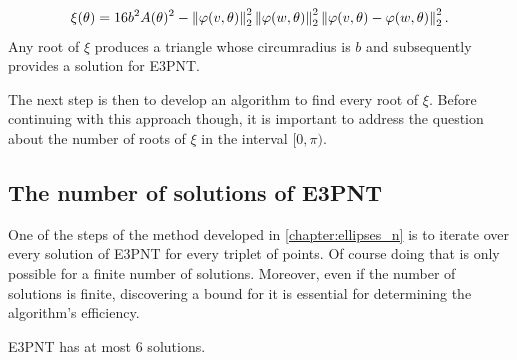 \begin{equation}\label{eq:circumscribed_circle_b}
\xi(\theta) = 16b^2A(\theta)^2 - \left\lVert\varphi(v, \theta)\right\rVert_{2}^2\left\lVert\varphi(w, \theta)\right\rVert_{2}^2\left\lVert\varphi(v, \theta)-\varphi(w, \theta)\right\rVert_{2}^2.
\end{equation}
Any root of $\xi$ produces a triangle whose circumradius is $b$ and subsequently provides a solution for E3PNT.

The next step is then to develop an algorithm to find every root of $\xi$.
Before continuing with this approach though, it is important to address the question about the number of roots of $\xi$ in the interval $[0, \pi)$.

\subsection{The number of solutions of E3PNT}

One of the steps of the method developed in \autoref{chapter:ellipses_n} is to iterate over every solution of E3PNT for every triplet of points. Of course doing that is only possible for a finite number of solutions. Moreover, even if the number of solutions is finite, discovering a bound for it is essential for determining the algorithm's efficiency.

\begin{lema}
	E3PNT has at most $6$ solutions.
\end{lema}

